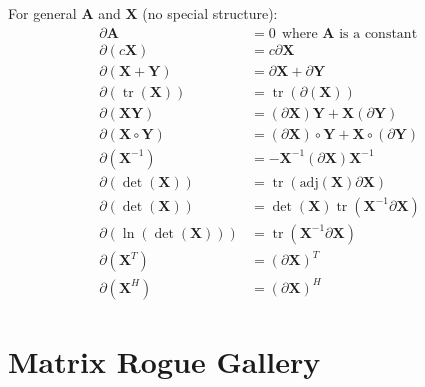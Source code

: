 \documentclass{book}
\newcommand{\mA}{\mathbf{A}}
\newcommand{\mX}{\mathbf{X}}
\newcommand{\mY}{\mathbf{Y}}
\DeclareMathOperator{\trace}{tr}
\begin{document}
For general $\mA$ and $\mX$ (no special structure):
\begin{align}
\partial\mA           &= 0~~\textrm{where $\mA$ is a constant} \\
\partial(c\mX)        &= c\partial\mX                          \\
\partial(\mX+\mY)     &= \partial\mX+\partial\mY               \\
\partial(\trace(\mX)) &= \trace(\partial(\mX))                 \\
\partial(\mX\mY)      &= (\partial\mX)\mY + \mX(\partial\mY)   \\
\partial(\mX\circ\mY) &= (\partial\mX)\circ\mY + \mX\circ(\partial\mY) \\
\partial(\mX^{-1})    &= -\mX^{-1}(\partial\mX)\mX^{-1}        \\
\partial(\det(\mX))   &= \trace(\textrm{adj}(\mX)\partial\mX)  \\
\partial(\det(\mX))   &= \det(\mX)\trace(\mX^{-1}\partial\mX)  \\
\partial(\ln(\det(\mX))) &= \trace(\mX^{-1}\partial\mX)        \\
\partial(\mX^T)       &= (\partial\mX)^T                       \\
\partial(\mX^H)       &= (\partial\mX)^H                       
\end{align}



\chapter{Matrix Rogue Gallery}
\end{document}
